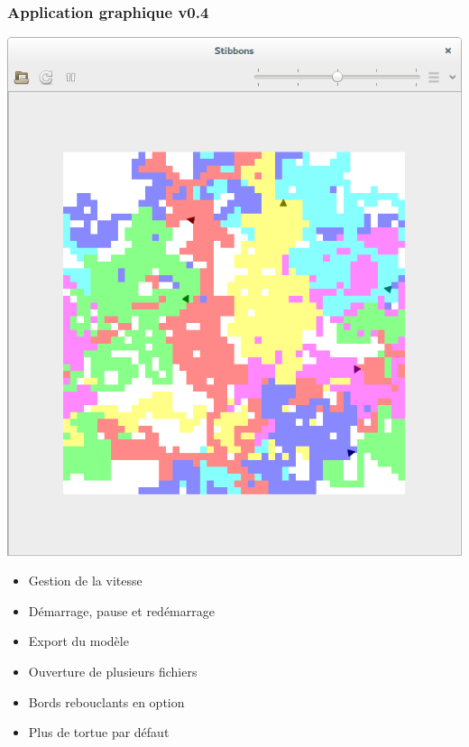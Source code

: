 \begin{frame}
\frametitle{Application graphique v0.4}
\begin{center}
\includegraphics[scale=0.16]{doc/report/screenshot/stibbons-0-4-2.png}
\end{center}

\begin{itemize}
	\item Gestion de la vitesse
	\item Démarrage, pause et redémarrage
	\item Export du modèle
	\item Ouverture de plusieurs fichiers
	\item Bords rebouclants en option
	\item Plus de tortue par défaut
\end{itemize}
\end{frame}

